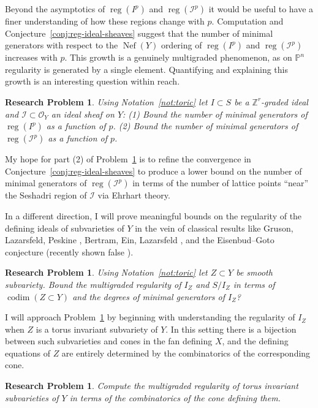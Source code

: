 \documentclass[11pt,reqno]{amsart}
\newtheorem{problem}[lemma]{Research Problem}
\theoremstyle{remark}
\newcommand{\reg}{\operatorname{reg}}
\newcommand{\codim}{\operatorname{codim}}
\newcommand{\Nef}{\operatorname{Nef}}
\newcommand{\PP}{\mathbb{P}}
\newcommand{\ZZ}{\mathbb{Z}}
\newcommand{\cI}{\mathcal{I}}
\newcommand{\cO}{\mathcal{O}}
\begin{document}
Beyond the asymptotics of $\reg(I^p)$ and $\reg(\cI^p)$ it would be useful to have a finer understanding of how these regions change with $p$. Computation and Conjecture~\ref{conj:reg-ideal-sheaves} suggest that the number of minimal generators with respect to the $\Nef(Y)$ ordering of $\reg(I^p)$ and $\reg(\cI^p)$ increases with $p$. This growth is a genuinely multigraded phenomenon, as on $\PP^n$ regularity is generated by a single element. Quantifying and explaining this growth is an interesting question within reach. 

 \begin{problem}\label{prob:corners}
 	Using Notation~\ref{not:toric} let $I\subset S$ be a $\ZZ^r$-graded ideal and $\cI \subset \cO_{Y}$ an ideal sheaf on $Y$: (1)  Bound the number of minimal generators of $\reg(I^p)$ as a function of $p$. (2)  Bound the number of minimal generators of $\reg(\cI^p)$ as a function of $p$.
\end{problem}

My hope for part (2) of Problem~\ref{prob:corners} is to refine the convergence in Conjecture~\ref{conj:reg-ideal-sheaves} to produce a lower bound on the number of minimal generators of $\reg(\cI^p)$ in terms of the number of lattice points ``near'' the Seshadri region of $\cI$ via Ehrhart theory.

 In a different direction, I will prove meaningful bounds on the regularity of the defining ideals of subvarieties of $Y$ in the vein of classical results like Gruson, Lazarsfeld, Peskine \cite{GLP83},  Bertram, Ein, Lazarsfeld \cite{BEL91}, and the Eisenbud--Goto conjecture \cite{eisenbudGoto84} (recently shown false \cite{MP18}). 
 	
 \begin{problem}\label{prob:subvariety-bound}
 	Using Notation~\ref{not:toric} let  $Z\subset Y$ be smooth subvariety. Bound the multigraded regularity of $I_{Z}$ and $S/I_{Z}$ in terms of $\codim(Z\subset Y)$ and the degrees of minimal generators of $I_{Z}$?
\end{problem}

I will approach Problem~\ref{prob:subvariety-bound} by beginning with understanding the regularity of $I_{Z}$ when $Z$ is a torus invariant subvariety of $Y$. In this setting there is a bijection between such subvarieties and cones in the fan defining $X$, and the defining equations of $Z$ are entirely determined by the combinatorics of the corresponding cone. 

\begin{problem}\label{prob:torus-invariant-mg}
	Compute the multigraded regularity of torus invariant subvarieties of $Y$ in terms of the combinatorics of the cone defining them.
\end{problem}
\end{document}
